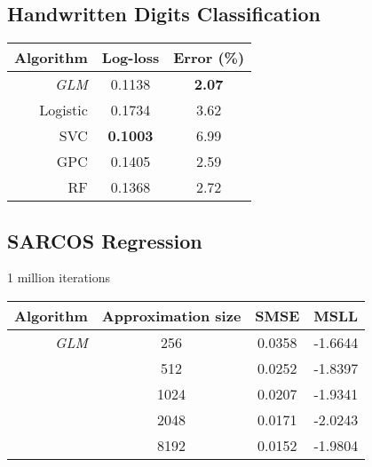 \documentclass[11pt, oneside]{article}
\begin{document}
\subsection{Handwritten Digits Classification}

\begin{table}[htb]

    \centering
    \begin{tabular}{r|c c}
        \textbf{Algorithm} & \textbf{Log-loss} & \textbf{Error (\%)} \\
        \hline
        \emph{GLM} & 0.1138 & \textbf{2.07} \\
        Logistic & 0.1734 & 3.62 \\
        SVC & \textbf{0.1003} & 6.99 \\
        GPC &  0.1405 & 2.59 \\
        RF & 0.1368 & 2.72 \\
        \hline
    \end{tabular}

\end{table}

\subsection{SARCOS Regression}

1 million iterations

\begin{table}[htb]

    \centering
    \begin{tabular}{r|c|c c}
        \textbf{Algorithm} & \textbf{Approximation size} & \textbf{SMSE} &
        \textbf{MSLL} \\
        \hline
        \emph{GLM} & 256 & 0.0358 & -1.6644 \\
        & 512 & 0.0252 & -1.8397 \\
        & 1024 & 0.0207 & -1.9341 \\
        & 2048 & 0.0171 & -2.0243 \\
        & 8192 & 0.0152 & -1.9804 \\
        \hline
    \end{tabular}

\end{table}


\end{document}
